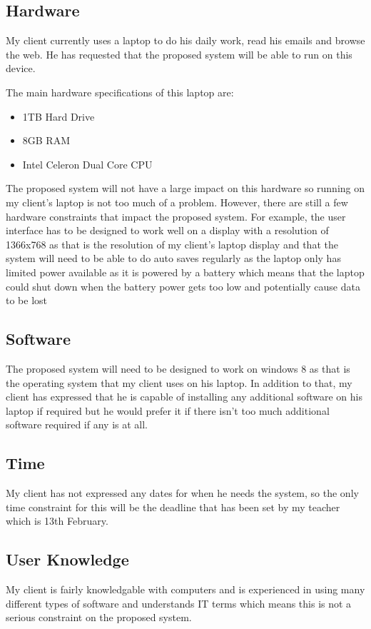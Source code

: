 \subsection{Hardware}
My client currently uses a laptop to do his daily work, read his emails and browse the web. He has requested that the proposed system will be able to run on this device.

The main hardware specifications of this laptop are:
\begin{itemize}
	\item 1TB Hard Drive
	\item 8GB RAM
	\item Intel Celeron Dual Core CPU
\end{itemize}
The proposed system will not have a large impact on this hardware so running on my client's laptop is not too much of a problem.
However, there are still a few hardware constraints that impact the proposed system. For example, the user interface has to be designed to work well on a display with a resolution of 1366x768 as that is the resolution of my client's laptop display and that the system will need to be able to do auto saves regularly as the laptop only has limited power available as it is powered by a battery which means that the laptop could shut down when the battery power gets too low and potentially cause data to be lost
\subsection{Software}
The proposed system will need to be designed to work on windows 8 as that is the operating system that my client uses on his laptop. In addition to that, my client has expressed that he is capable of installing any additional software on his laptop if required but he would prefer it if there isn't too much additional software required if any is at all.
\subsection{Time}
My client has not expressed any dates for when he needs the system, so the only time constraint for this will be the deadline that has been set by my teacher which is 13th February.
\subsection{User Knowledge}
My client is fairly knowledgable with computers and is experienced in using many different types of software and understands IT terms which means this is not a serious constraint on the proposed system.
